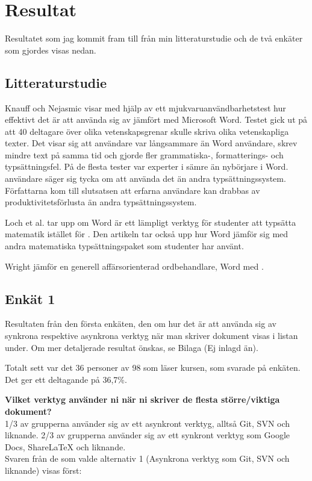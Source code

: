 \section{Resultat}
\label{sec:results-tuhkala}
Resultatet som jag kommit fram till från min litteraturstudie och de två enkäter som gjordes visas nedan.

\subsection{Litteraturstudie}
Knauff och Nejasmic \cite{knauff2014efficiency} visar med hjälp av ett mjukvaruanvändbarhetstest hur effektivt det är att använda sig av \latex jämfört med Microsoft Word. Testet gick ut på att 40 deltagare över olika vetenskapsgrenar skulle skriva olika vetenskapliga texter.
Det visar sig att \latex användare var långsammare än Word användare, skrev mindre text på samma tid och gjorde fler grammatiska-, formatterings- och typsättningsfel. På de flesta tester var experter i \latex sämre än nybörjare i Word. \latex användare säger sig tycka om att använda det än andra typsättningssystem. Författarna kom till slutsatsen att erfarna \latex användare kan drabbas av produktivitetsförlusta än andra typsättningssystem.

Loch et al. \cite{loch2014master} tar upp om Word är ett lämpligt verktyg för studenter att typsätta matematik istället för \latex. Den artikeln tar också upp hur Word jämför sig med andra matematiska typsättningspaket som studenter har använt. 

Wright \cite{wright2010technical} jämför en generell affärsorienterad ordbehandlare, Word med \latex.  


\subsection{Enkät 1}
Resultaten från den första enkäten, den om hur det är att använda sig av synkrona respektive asynkrona verktyg när man skriver dokument visas i listan under. Om mer detaljerade resultat önskas, se Bilaga (Ej inlagd än).

Totalt sett var det 36 personer av 98 som läser kursen, som svarade på enkäten. Det ger ett deltagande på 36,7\%.

\textbf{Vilket verktyg använder ni när ni skriver de flesta större/viktiga dokument?}
\\1/3 av grupperna använder sig av ett asynkront verktyg, alltså Git, SVN och liknande. 2/3 av grupperna använder sig av ett synkront verktyg som Google Docs, ShareLaTeX och liknande.
\\Svaren från de som valde alternativ 1 (Asynkrona verktyg som Git, SVN och liknande) visas först:

